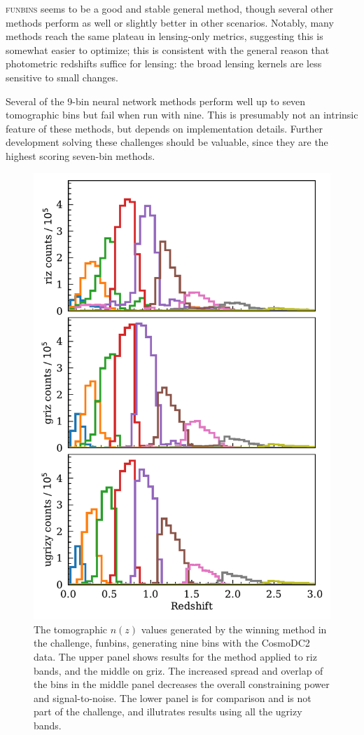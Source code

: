 \documentclass[twocolumn,twocolappendix]{aastex63}
\begin{document}
\textsc{funbins} seems to be a good and stable general method, though several other methods perform as well
or slightly better in other scenarios.  Notably, many methods reach the same plateau in lensing-only metrics,
suggesting this is somewhat easier to optimize; this is consistent with the general reason that photometric
redshifts suffice for lensing: the broad lensing kernels are less sensitive to small changes.

Several of the 9-bin neural network methods perform well up to seven tomographic bins but fail when run with 
nine.  This is presumably not an intrinsic feature of these methods, but depends on implementation details.
Further development solving these challenges should be valuable, since they are the highest scoring seven-bin
methods.

\begin{figure}[htbp]
\includegraphics[width=1\linewidth]{results/funbins_nz.pdf}
\caption{The tomographic $n(z)$ values generated by the winning method in the challenge, {\sc funbins},
generating nine bins with the CosmoDC2 data.
The upper panel shows results for the method applied to riz bands, and the middle on griz. The
increased spread and overlap of the bins in the middle panel decreases the overall constraining
power and signal-to-noise.  The lower panel is for comparison and is not part of the challenge,
and illutrates results using all the ugrizy bands.}
\label{fig:funbin_nz}
\end{figure}
\end{document}
